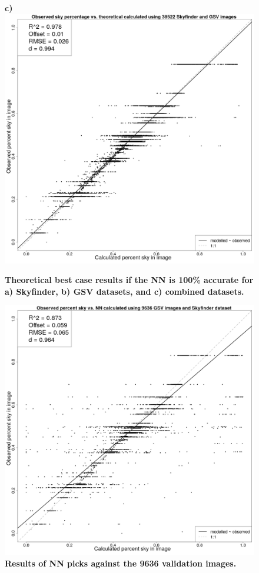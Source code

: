 \documentclass[final,3p,times,authoryear]{elsarticle}
\begin{document}
\begin{figure}
\textbf{c)}\includegraphics[scale=0.15]{Images/ErrorPlots1Combined.png}
\caption{\textbf{Theoretical best case results if the NN is 100\% accurate for a) Skyfinder, b) GSV datasets, and c) combined datasets.}}
\label{fig:errorplots}
\end{figure}


\begin{figure}
\centering
\includegraphics[scale=0.15]{Images/ErrorPlotsCNTK.png}
\caption{\textbf{Results of NN picks against the 9636 validation images.}}
\label{fig:errorplotscntk}
\end{figure}
\end{document}

